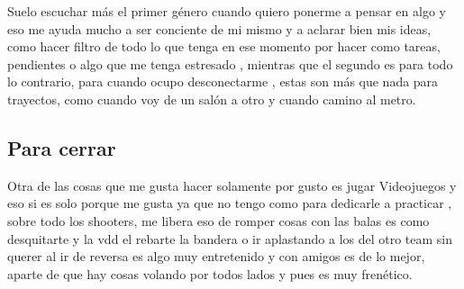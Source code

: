 \documentclass[letterpaper, 12pt]{article}
\begin{document}
    
    Suelo escuchar más el primer género cuando quiero ponerme a pensar en algo y eso me ayuda mucho a ser conciente de mi mismo y a aclarar bien mis ideas, como hacer filtro de todo lo que tenga en ese momento por hacer como tareas, pendientes o algo que me tenga estresado%
    , mientras que el segundo es para todo lo contrario, para cuando ocupo desconectarme%
    , estas son más que nada para trayectos, como cuando voy de un salón a otro y cuando camino al metro.%
    
    \subsection*{Para cerrar}
    
    
    
    Otra de las cosas que me gusta hacer solamente por gusto es jugar Videojuegos y eso si es solo porque me gusta ya que no tengo como para dedicarle a practicar%
    , sobre todo los shooters, me libera eso de romper cosas con las balas es como desquitarte y la vdd el rebarte la bandera o ir aplastando a los del otro team sin querer al ir de reversa es algo muy entretenido%
     y con amigos es de lo mejor, aparte de que hay cosas volando por todos lados y pues es muy frenético.\\
    
\end{document}
